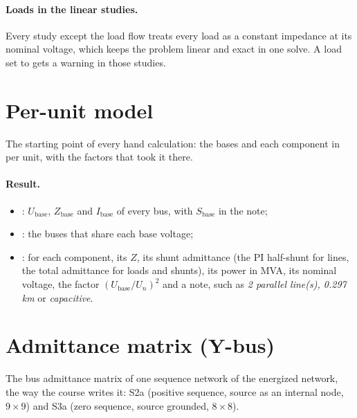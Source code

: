 \paragraph{Loads in the linear studies.} Every study except the load flow treats every
load as a constant impedance at its nominal voltage, which keeps the problem linear and
exact in one solve. A load set to  gets a warning in those studies.

\section{Per-unit model}\label{sec:study-model}

The starting point of every hand calculation: the bases and each component in per unit,
with the factors that took it there.



\paragraph{Result.}
\begin{itemize}
  \item {}: $U_\text{base}$, $Z_\text{base}$ and $I_\text{base}$ of every
    bus, with $S_\text{base}$ in the note;
  \item {}: the buses that share each base voltage;
  \item {}: for each component, its $Z$, its shunt
    admittance (the PI half-shunt for lines, the total admittance for loads and shunts),
    its power in MVA, its nominal voltage, the factor $(U_\text{base}/U_n)^2$ and a note,
    such as \emph{2 parallel line(s), 0.297 km} or \emph{capacitive}.
\end{itemize}

\section{Admittance matrix (Y-bus)}\label{sec:study-ybus}

The bus admittance matrix of one sequence network of the energized network, the way the
course writes it: S2a (positive sequence, source as an internal node, $9\times9$) and S3a
(zero sequence, source grounded, $8\times8$).

